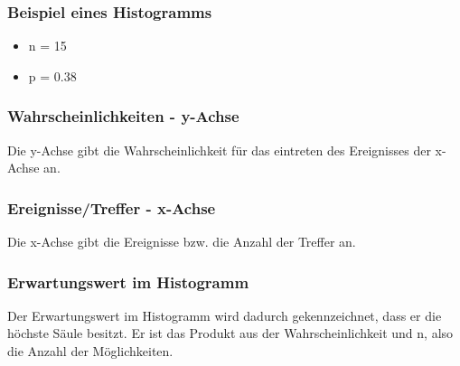 	\subsubsection{Beispiel eines Histogramms}
	\begin{itemize}
		\item n = 15
		\item p = 0.38
	\end{itemize}
	\subsubsection{Wahrscheinlichkeiten - y-Achse}
	Die y-Achse gibt die Wahrscheinlichkeit für das eintreten des Ereignisses der x-Achse an.
	
	\subsubsection{Ereignisse/Treffer - x-Achse}
	Die x-Achse gibt die Ereignisse bzw. die Anzahl der Treffer an.
	
	\subsubsection{Erwartungswert im Histogramm}
	Der Erwartungswert im Histogramm wird dadurch gekennzeichnet, dass er die höchste Säule besitzt. Er ist das Produkt aus der Wahrscheinlichkeit und n, also die Anzahl der Möglichkeiten.

